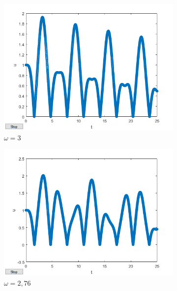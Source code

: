 \begin{figure}[h!]
\centering
\begin{subfigure}[b]{0.31\linewidth}
         \centering
         \includegraphics[width=1\linewidth]{graphics/ut_w3_r095_omega0_ksi0.png}
         \caption{$\omega=3$}
         \label{fig:w3000_1}
     \end{subfigure}
     \begin{subfigure}[b]{0.31\linewidth}
         \centering
         \includegraphics[width=1\linewidth]{graphics/ut_w276_r095_omega0_ksi0.png}
         \caption{$\omega=2,76$}
         \label{fig:w276_1}
     \end{subfigure}
     \begin{subfigure}[b]{0.31\linewidth}

\end{subfigure}
\end{figure}
